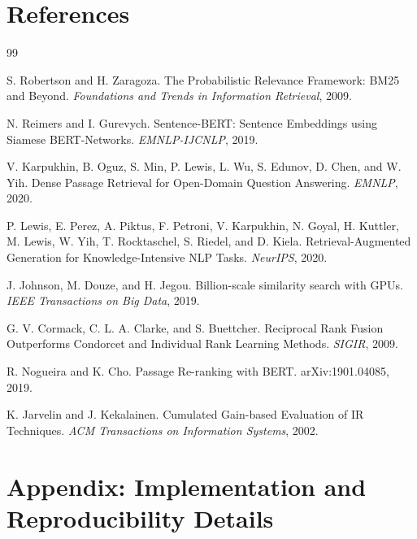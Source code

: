 \documentclass[11pt,a4paper]{article}
\begin{document}
\section{References}

\begin{thebibliography}{99}

S. Robertson and H. Zaragoza.
\newblock The Probabilistic Relevance Framework: BM25 and Beyond.
\newblock \textit{Foundations and Trends in Information Retrieval}, 2009.

N. Reimers and I. Gurevych.
\newblock Sentence-BERT: Sentence Embeddings using Siamese BERT-Networks.
\newblock \textit{EMNLP-IJCNLP}, 2019.

V. Karpukhin, B. Oguz, S. Min, P. Lewis, L. Wu, S. Edunov, D. Chen, and W. Yih.
\newblock Dense Passage Retrieval for Open-Domain Question Answering.
\newblock \textit{EMNLP}, 2020.

P. Lewis, E. Perez, A. Piktus, F. Petroni, V. Karpukhin, N. Goyal, H. Kuttler,
M. Lewis, W. Yih, T. Rocktaschel, S. Riedel, and D. Kiela.
\newblock Retrieval-Augmented Generation for Knowledge-Intensive NLP Tasks.
\newblock \textit{NeurIPS}, 2020.

J. Johnson, M. Douze, and H. Jegou.
\newblock Billion-scale similarity search with GPUs.
\newblock \textit{IEEE Transactions on Big Data}, 2019.

G. V. Cormack, C. L. A. Clarke, and S. Buettcher.
\newblock Reciprocal Rank Fusion Outperforms Condorcet and Individual Rank
Learning Methods.
\newblock \textit{SIGIR}, 2009.

R. Nogueira and K. Cho.
\newblock Passage Re-ranking with BERT.
\newblock arXiv:1901.04085, 2019.

K. Jarvelin and J. Kekalainen.
\newblock Cumulated Gain-based Evaluation of IR Techniques.
\newblock \textit{ACM Transactions on Information Systems}, 2002.

\end{thebibliography}

\appendix

\section{Appendix: Implementation and Reproducibility Details}
\end{document}
